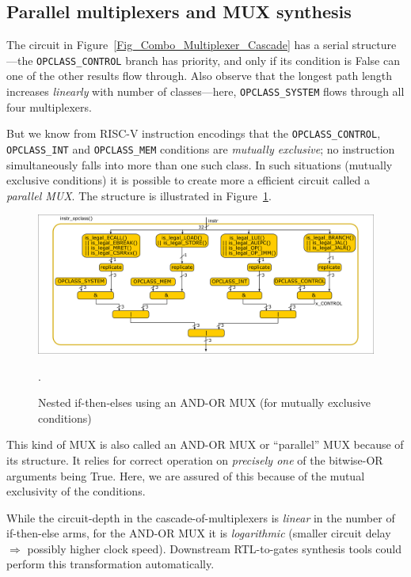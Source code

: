 
\subsection{Parallel multiplexers and MUX synthesis}

\label{Sec_MUXes}


The circuit in Figure~\ref{Fig_Combo_Multiplexer_Cascade} has a serial
structure---the \verb|OPCLASS_CONTROL| branch has priority, and only
if its condition is False can one of the other results flow through.
Also observe that the longest path length increases \emph{linearly}
with number of classes---here, \verb|OPCLASS_SYSTEM| flows through all
four multiplexers.

But we know from RISC-V instruction encodings that the
\verb|OPCLASS_CONTROL|, \verb|OPCLASS_INT| and \verb|OPCLASS_MEM|
conditions are \emph{mutually exclusive}; no instruction
simultaneously falls into more than one such class.  In such
situations (mutually exclusive conditions) it is possible to create
more a efficient circuit called a \emph{parallel MUX}.  The structure
is illustrated in Figure~\ref{Fig_Combo_Multiplexer_Parallel}.
\begin{figure}[htbp]
  \centerline{\includegraphics[width=6in,angle=0]{Figures/Fig_Combo_Multiplexer_Parallel}}
  \caption{\label{Fig_Combo_Multiplexer_Parallel}
           Nested if-then-elses using an AND-OR MUX (for mutually exclusive conditions)}.
\end{figure}

This kind of MUX is also called an AND-OR MUX or ``parallel'' MUX
because of its structure.  It relies for correct operation on
\emph{precisely one} of the bitwise-OR arguments being True.  Here, we
are assured of this because of the mutual exclusivity of the
conditions.

While the circuit-depth in the cascade-of-multiplexers is
\emph{linear} in the number of if-then-else arms, for the AND-OR MUX
it is \emph{logarithmic} (smaller circuit delay $\Longrightarrow$
possibly higher clock speed).  Downstream RTL-to-gates synthesis tools
could perform this transformation automatically.


